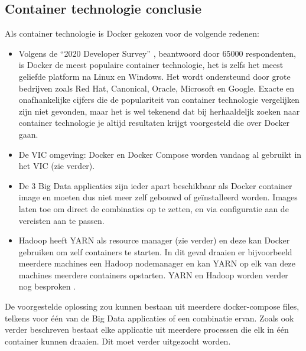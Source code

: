 \subsection{Container technologie conclusie}
Als container technologie is Docker gekozen voor de volgende redenen:
\newline
\begin{itemize}
    \item Volgens de ``2020 Developer Survey'' \autocite{Stackoverflow2020}, beantwoord door 65000 respondenten, is Docker de meest populaire container technologie, het is zelfs het meest geliefde platform na Linux en Windows.
    \newline
    Het wordt ondersteund door grote bedrijven zoals Red Hat, Canonical, Oracle, Microsoft en Google. Exacte en onafhankelijke cijfers die de populariteit van container technologie vergelijken zijn niet gevonden, maar het is wel tekenend dat bij herhaaldeljk zoeken naar container technologie je altijd resultaten krijgt voorgesteld die over Docker gaan.
    \item De VIC omgeving: Docker en Docker Compose worden vandaag al gebruikt in het VIC (zie verder).
    \item De 3 Big Data applicaties zijn ieder apart beschikbaar als Docker container image en moeten dus niet meer zelf gebouwd of geïnstalleerd worden. Images laten toe om direct de combinaties op te zetten, en via configuratie aan de vereisten aan te passen.
    \item Hadoop heeft YARN als resource manager (zie verder) en deze kan Docker gebruiken om zelf containers te starten. In dit geval draaien er bijvoorbeeld meerdere machines een Hadoop nodemanager en kan YARN op elk van deze machines meerdere containers opstarten. YARN en Hadoop worden verder nog besproken \autocite{Hadoop2023a}.
\end{itemize}

De voorgestelde oplossing zou kunnen bestaan uit meerdere docker-compose files, telkens voor één van de Big Data applicaties of een combinatie ervan. Zoals ook verder beschreven bestaat elke applicatie uit meerdere processen die elk in één container kunnen draaien. Dit moet verder uitgezocht worden.
\newline
\newline

